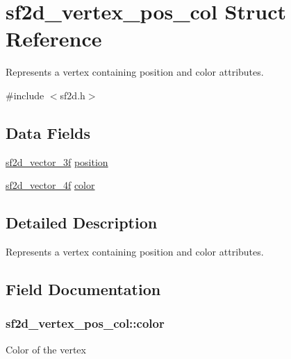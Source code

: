 \hypertarget{structsf2d__vertex__pos__col}{}\section{sf2d\+\_\+vertex\+\_\+pos\+\_\+col Struct Reference}
\label{structsf2d__vertex__pos__col}


Represents a vertex containing position and color attributes.  




{\ttfamily \#include $<$sf2d.\+h$>$}

\subsection*{Data Fields}
\begin{DoxyCompactItemize}
\item 
\hyperlink{structsf2d__vector__3f}{sf2d\+\_\+vector\+\_\+3f} \hyperlink{structsf2d__vertex__pos__col_a72c48b1c976984ef0512a28e8af7a1e4}{position}
\item 
\hyperlink{structsf2d__vector__4f}{sf2d\+\_\+vector\+\_\+4f} \hyperlink{structsf2d__vertex__pos__col_a9dcaaa5fac4047a013d1737f42e6b8e8}{color}
\end{DoxyCompactItemize}


\subsection{Detailed Description}
Represents a vertex containing position and color attributes. 

\subsection{Field Documentation}
\hypertarget{structsf2d__vertex__pos__col_a9dcaaa5fac4047a013d1737f42e6b8e8}{}
\subsubsection[{color}]{ sf2d\+\_\+vertex\+\_\+pos\+\_\+col\+::color}\label{structsf2d__vertex__pos__col_a9dcaaa5fac4047a013d1737f42e6b8e8}
Color of the vertex \hypertarget{structsf2d__vertex__pos__col_a72c48b1c976984ef0512a28e8af7a1e4}{}

